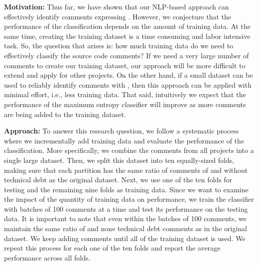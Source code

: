 
\vspace{3mm}
\noindent\chapterIVrqiii
\vspace{3mm}

\noindent \textbf{Motivation:} Thus far, we have shown that our NLP-based approach can effectively identify comments expressing \SATD. However, we conjecture that the performance of the classification depends on the amount of training data. At the same time, creating the training dataset is a time consuming and labor intensive task. So, the question that arises is: how much training data do we need to effectively classify the source code comments? If we need a very large number of comments to create our training dataset, our approach will be more difficult to extend and apply for other projects. On the other hand, if a small dataset can be used to reliably identify comments with \SATD, then this approach can be applied with minimal effort, i.e., less training data. That said, intuitively we expect that the performance of the maximum entropy classifier will improve as more comments are being added to the training dataset.

\noindent \textbf{Approach:} To answer this research question, we follow a systematic process where we incrementally add training data and evaluate the performance of the classification.
More specifically, we combine the comments from all projects into a single large dataset. Then, we split this dataset into ten equally-sized folds, making sure that each partition has the same ratio of comments of \SATD and without technical debt as the original dataset. Next, we use one of the ten folds for testing and the remaining nine folds as training data. Since we want to examine the impact of the quantity of training data on performance, we train the classifier with batches of 100 comments at a time and test its performance on the testing data. It is important to note that even within the batches of 100 comments, we maintain the same ratio of \SATD and none technical debt comments as in the original dataset. We keep adding comments until all of the training dataset is used. We repeat this process for each one of the ten folds and report the average performance across all folds.

